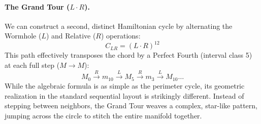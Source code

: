 \documentclass[12pt,letterpaper]{amsart}
\begin{document}
\paragraph{The Grand Tour ($L \cdot R$).}
We can construct a second, distinct Hamiltonian cycle by alternating the Wormhole ($L$) and Relative ($R$) operations:
\[ C_{LR} = (L \cdot R)^{12} \]
This path effectively transposes the chord by a Perfect Fourth (interval class 5) at each full step ($M \to M$):
\[ M_0 \xrightarrow{R} m_{10} \xrightarrow{L} M_5 \xrightarrow{R} m_3 \xrightarrow{L} M_{10} \dots \]
While the algebraic formula is as simple as the perimeter cycle, its geometric realization in the standard sequential layout is strikingly different. Instead of stepping between neighbors, the Grand Tour weaves a complex, star-like pattern, jumping across the circle to stitch the entire manifold together.
\end{document}
